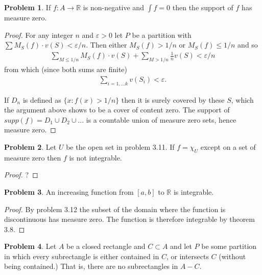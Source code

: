 \documentclass[20pt]{article}
\theoremstyle{plain}
\theoremstyle{definition}
\newtheorem*{problem}{Problem}
\newcommand{\reals}{\mathbb{R}}
\begin{document}
\begin{problem}{3.18}
  If $f: A\to\reals$ is non-negative and $\int f = 0$ then the
  support of $f$ has measure zero.
\end{problem}

\begin{proof}
  For any integer $n$ and $\varepsilon > 0$ let $P$ be a partition with 
  $\sum M_S(f)\cdot v(S) < \varepsilon/n.$ 
  Then either $M_S(f) > 1/n$ or $M_S(f) \leq 1/n$ and so 
  \begin{align*}
    \sum_{M\leq 1/n} M_S(f) \cdot v(S) + \sum_{M > 1/n} \frac{1}{n}v(S) < 
    \varepsilon/n
  \end{align*}
  from which (since both sums are finite)
  \begin{align*}
    \sum_{i = 1,...k} v(S_i) < \varepsilon.
  \end{align*}

  If $D_n$ is defined as  $\{ x: f(x) > 1 / n \}$ then it is surely covered by these
  $S$, which the argument above shows to be a cover of content zero.
  The support of $supp(f) = D_1 \cup D_2 \cup ...$ is a countable union of 
  measure zero sets, hence measure zero.
\end{proof}


\begin{problem}{3.19}
  Let $U$ be the open set in problem 3.11.
  If $f = \chi_U$ except on a set of measure zero then $f$ is not integrable.
\end{problem}

\begin{proof}
  \color{ForestGreen}?
\end{proof}


\begin{problem}{3.20}
  An increasing function from $[a, b]$ to $\reals$ is integrable.
\end{problem}
\begin{proof}
  By problem 3.12 the subset of the domain where the function is 
  discontinuous has measure zero. The function is therefore integrable by theorem 3.8.
\end{proof}


\begin{problem}{3.21}
  Let $A$ be a closed rectangle and $C \subset A$ and let $P$ be some 
  partition in which every subrectangle is either contained in $C$, 
  or intersects $C$ (without being contained.)  That is, there are no
  subrectangles in $A-C$.
\end{problem}
\end{document}
